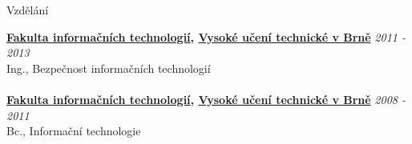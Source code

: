 \documentclass{cv} %
\begin{document}

\begin{rSection}{Vzdělání}

{\bf 
\href{https://www.fit.vut.cz/}{Fakulta informačních technologií}, \href{https://www.vutbr.cz}{Vysoké učení technické v Brně}} \hfill {\em 2011 - 2013} 
\\ Ing., Bezpečnost informačních technologií
\\
\\{\bf 
\href{https://www.fit.vut.cz/}{Fakulta informačních technologií}, \href{https://www.vutbr.cz}{Vysoké učení technické v Brně}} \hfill {\em 2008 - 2011} 
\\ Bc., Informační technologie

\end{rSection}
\end{document}
